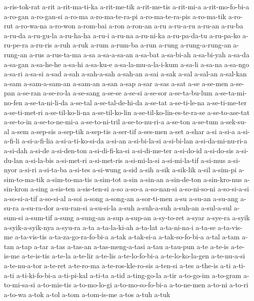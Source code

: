 {a-ris-tok-rat a-rit a-rit-ma-ti-ka a-rit-me-tik a-rit-me-tis a-rit-mi-a
a-rit-mo-fo-bi-a a-ro-gan a-ro-gan-si a-ro-ma a-ro-ma-te-ra-pi
a-ro-ma-te-ra-pis a-ro-ma-tik a-ro-rut a-ro-wa-na a-ro-won a-rom-bai a-ron
a-ron-an a-ru a-ru-a-ru a-ru-an a-ru-ba a-ru-da a-ru-gu-la a-ru-ha-ha
a-ru-i a-ru-na a-ru-ni-ka a-ru-pa-da-tu a-ru-pa-ko a-ru-pe-ra a-ru-ris
a-ruh a-ruk a-rum a-rum-ba a-run a-rung a-rung-a-rung-an a-rung-an a-rus
a-rus-ta-ma a-sa a-sa-a-sa-an a-sa-bat a-sa-bi-ah a-sa-bi-yah a-sa-da
a-sa-gan a-sa-he-he a-sa-hi a-sa-ku-e a-sa-la-mu-a-la-i-kum a-sa-li
a-sa-na a-sa-ngo a-sa-ri a-sa-si a-sad a-sah a-sah-a-sah a-sah-an a-sai
a-sak a-sal a-sal-an a-sal-kan a-sam a-sam-a-sam-an a-sam-an a-san a-sap
a-sar a-sas a-sat a-se a-se-men a-se-pan a-se-ran a-se-ro-la a-se-sang
a-se-se a-se-si a-se-sor a-se-ta-bu-lum a-se-ta-mi-no-fen a-se-ta-ni-li-da
a-se-tal a-se-tal-de-hi-da a-se-tat a-se-ti-le-na a-se-ti-me-ter
a-se-ti-met-ri a-se-til-ko-li-na a-se-til-ko-lin
a-se-til-ko-lin-es-te-ra-se a-se-to-ase-tat a-se-to-in a-se-to-ne-mi-a
a-se-to-ni-tril a-se-to-nu-ri-a a-se-ton a-se-tum a-sek-su-al a-sem
a-sep-sis a-sep-tik a-sep-tis a-ser-tif a-ses-men a-set a-shar a-si a-si-a
a-si-a-fi-li a-si-a-fi-lia a-si-a-ti-ko-si-da a-si-an a-si-bi-la-si
a-si-bi-lan a-si-da-mi-nu-ri-a a-si-dah a-si-de a-si-den-ton
a-si-di-fi-ka-si a-si-di-me-ter a-si-do-id a-si-do-sis a-si-du-lan
a-si-la-bis a-si-met-ri a-si-met-ris a-si-mi-la-si a-si-mi-la-tif a-si-mus
a-si-nyor a-si-ri a-si-ta-ba a-si-tes a-si-wung a-sid a-sih a-sik
a-sik-lik a-sil a-sim-pi a-sim-to-ma-tik a-sim-to-ma-tis a-sim-tot a-sin
a-sin-an a-sin-de-ton a-sin-kro-nus a-sin-kron a-sing a-sis-ten
a-sis-ten-si a-so a-so-a a-so-nan-si a-so-ni-so-ni a-so-si-a-si
a-so-si-a-tif a-so-si-al a-soi a-song a-song-an a-sor-ti-men a-su a-su-an
a-su-ang a-su-ra a-su-ra-dor a-su-ran-si a-su-si-la a-suh a-suh-a-suh
a-suh-an a-sul-a-sul a-sum-si a-sum-tif a-sung a-sung-an a-sup a-sup-an
a-sy-to-ret a-syar a-sye-ra a-syik a-syik-a-syik-nya a-syu-ra a-ta
a-ta-la-ki-ah a-ta-lat a-ta-ni-na-i a-ta-se a-ta-vis-me a-ta-vis-tis
a-ta-za-go-ra-fo-bi-a a-tak a-tak-si-a a-tak-so-fo-bi-a a-tal a-tam a-tan
a-tap a-tar a-tas a-tas-an a-tas-meng-a-tasi a-tau a-tau-pun a-te a-te-is
a-te-is-me a-te-is-tis a-te-la a-te-lir a-te-lis a-te-lo-fo-bi-a
a-te-lo-ko-la-gen a-te-nu-a-si a-te-nu-a-tor a-te-ret a-te-ro-ma
a-te-ros-kle-ro-sis a-ten-si a-tes a-the-is a-ti a-ti-a-ti a-ti-ki-fo-bi-a
a-ti-pi-kal a-ti-ta a-tid a-ting-go-la a-tir a-to-go-im a-to-gram
a-to-mi-sa-si a-to-mis-tis a-to-mo-lo-gi a-to-mo-so-fo-bi-a a-to-ne-men
a-to-ni a-to-ri a-to-wa a-tok a-tol a-tom a-tom-is-me a-tos a-tuh a-tuk
}
